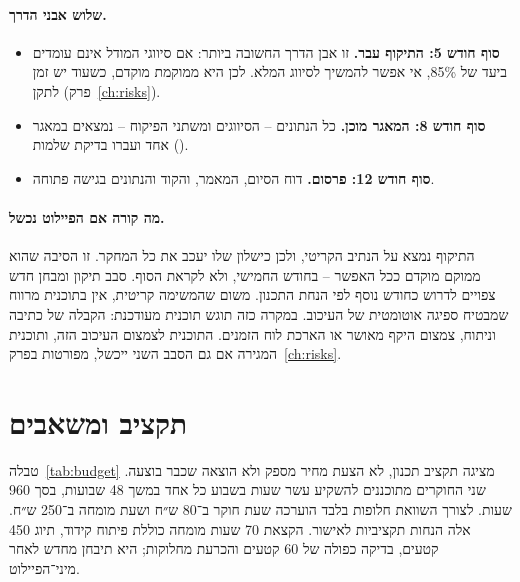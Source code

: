 \paragraph{שלוש אבני הדרך.}
\begin{itemize}
  \item \textbf{סוף חודש 5: התיקוף עבר.} זו אבן הדרך החשובה ביותר: אם סיווגי המודל אינם עומדים ביעד של 85\%, אי אפשר להמשיך לסיווג המלא. לכן היא ממוקמת מוקדם, כשעוד יש זמן לתקן (פרק~\ref{ch:risks}).
  \item \textbf{סוף חודש 8: המאגר מוכן.} כל הנתונים – הסיווגים ומשתני הפיקוח – נמצאים במאגר אחד ועברו בדיקת שלמות ().
  \item \textbf{סוף חודש 12: פרסום.} דוח הסיום, המאמר, והקוד והנתונים בגישה פתוחה.
\end{itemize}

\paragraph{מה קורה אם הפיילוט נכשל.} התיקוף נמצא על הנתיב הקריטי, ולכן כישלון שלו יעכב את כל המחקר. זו הסיבה שהוא ממוקם מוקדם ככל האפשר – בחודש החמישי, ולא לקראת הסוף. סבב תיקון ומבחן חדש צפויים לדרוש כחודש נוסף לפי הנחת התכנון. משום שהמשימה קריטית, אין בתוכנית מרווח שמבטיח ספיגה אוטומטית של העיכוב. במקרה כזה תוגש תוכנית מעודכנת: הקבלה של כתיבה וניתוח, צמצום היקף מאושר או הארכת לוח הזמנים. התוכנית לצמצום העיכוב הזה, ותוכנית המגירה אם גם הסבב השני ייכשל, מפורטות בפרק~\ref{ch:risks}.


\section{תקציב ומשאבים}
\label{sec:wp-budget}

טבלה~\ref{tab:budget} מציגה תקציב תכנון, לא הצעת מחיר מספק ולא הוצאה שכבר בוצעה. שני החוקרים מתוכננים להשקיע עשר שעות בשבוע כל אחד במשך 48 שבועות, בסך 960 שעות. לצורך השוואת חלופות בלבד הוערכה שעת חוקר ב־80 ש״ח ושעת מומחה ב־250 ש״ח. אלה הנחות תקציביות לאישור. הקצאת 70 שעות מומחה כוללת פיתוח קידוד, תיוג 450 קטעים, בדיקה כפולה של 60 קטעים והכרעת מחלוקות; היא תיבחן מחדש לאחר מיני־הפיילוט.

